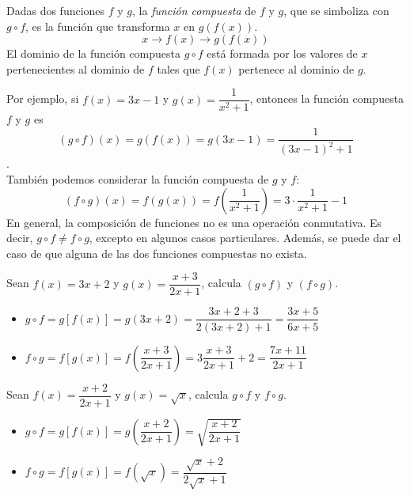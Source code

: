 
\begin{definition}
Dadas dos funciones $f$ y $g$, la \emph{función compuesta} de $f$ y $g$, que se simboliza con $g \circ f$, es la función que transforma $x$ en $g(f(x))$.
$$ x \rightarrow f(x) \rightarrow g(f(x))$$
El dominio de la función compuesta $g \circ f$ está formada por los valores de $x$ pertenecientes al dominio de $f$ tales que $f(x)$ pertenece al dominio de $g$.
\end{definition}
Por ejemplo, si $f(x) = 3x - 1$ y $g(x) = \dfrac{1}{x^{2}+1}$, entonces la función compuesta $f$ y $g$ es $$(g \circ f)(x) = g(f(x)) = g(3x-1) = \dfrac{1}{(3x-1)^{2}+1}$$.\\
También podemos considerar la función compuesta de $g$ y $f$:
$$(f \circ g)(x) = f(g(x)) = f(\dfrac{1}{x^2 + 1}) = 3 \cdot \dfrac{1}{x^2 + 1} - 1$$
En general, la composición de funciones no es una operación conmutativa. Es decir, $g \circ f \neq f \circ g$, excepto en algunos casos particulares. Además, se puede dar el caso de que alguna de las dos funciones compuestas no exista.

\begin{ex}
	Sean $f(x)=3x+2$ y $g(x)=\dfrac{x+3}{2x+1}$, calcula $(g \circ f)$ y $(f \circ g)$.
	\begin{sol}
		\begin{itemize}
			\item $g \circ f = g[f(x)] = g(3x+2) = \dfrac{3x+2+3}{2(3x+2)+1} = \dfrac{3x+5}{6x+5}$
			\item $f \circ g = f[g(x)] = f(\dfrac{x+3}{2x+1}) = 3\dfrac{x+3}{2x+1} + 2=\dfrac{7x+11}{2x+1}$
		\end{itemize}
	\end{sol}
\end{ex}

\vspace{1cm}


\begin{ex}
	Sean $f(x)=\dfrac{x+2}{2x+1}$ y $g(x)=\sqrt{x}$, calcula $g \circ f$ y $f \circ g$.
	\begin{sol}
		\begin{itemize}
			\item $g \circ f = g[f(x)] = g(\dfrac{x+2}{2x+1}) = \sqrt{\dfrac{x+2}{2x+1}}$
			\item $f \circ g = f[g(x)] = f(\sqrt{x}) =\dfrac{\sqrt{x}+2}{2\sqrt{x}+1}$
		\end{itemize}
	\end{sol}
\end{ex}


